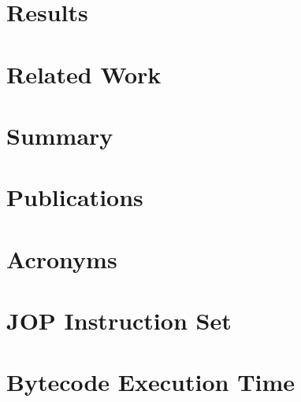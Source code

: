 \chapter{Results}

\label{chap:results}
    

\chapter{Related Work}
\label{chap:related}

    


\chapter{Summary}
\label{chap:conclusions}

    





\appendix
 \ihead{\leftmark} %

\chapter{Publications}
    

\chapter{Acronyms}
 \label{appx:acro}



\chapter{JOP Instruction Set} \label{appx:jop:instr}


\chapter{Bytecode Execution Time} \label{appx:bytecode}


